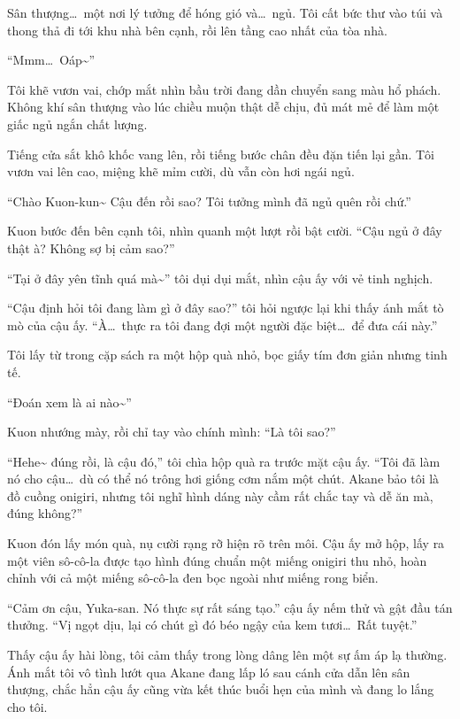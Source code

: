 \documentclass[../main.tex]{subfiles}
\begin{document}
Sân thượng\dots\ một nơi lý tưởng để hóng gió và\dots\ ngủ. Tôi cất bức thư vào túi và thong thả đi tới khu nhà bên cạnh, rồi lên tầng cao nhất của tòa nhà.

\ct


``Mmm\dots\ Oáp\~{}''

Tôi khẽ vươn vai, chớp mắt nhìn bầu trời đang dần chuyển sang màu hổ phách. Không khí sân thượng vào lúc chiều muộn thật dễ chịu, đủ mát mẻ để làm một giấc ngủ ngắn chất lượng.

Tiếng cửa sắt khô khốc vang lên, rồi tiếng bước chân đều đặn tiến lại gần. Tôi vươn vai lên cao, miệng khẽ mỉm cười, dù vẫn còn hơi ngái ngủ.

``Chào Kuon-kun\~{} Cậu đến rồi sao? Tôi tưởng mình đã ngủ quên rồi chứ.''

Kuon bước đến bên cạnh tôi, nhìn quanh một lượt rồi bật cười. ``Cậu ngủ ở đây thật à? Không sợ bị cảm sao?''

``Tại ở đây yên tĩnh quá mà\~{}'' tôi dụi dụi mắt, nhìn cậu ấy với vẻ tinh nghịch.

``Cậu định hỏi tôi đang làm gì ở đây sao?'' tôi hỏi ngược lại khi thấy ánh mắt tò mò của cậu ấy. ``À\dots\ thực ra tôi đang đợi một người đặc biệt\dots\ để đưa cái này.''

Tôi lấy từ trong cặp sách ra một hộp quà nhỏ, bọc giấy tím đơn giản nhưng tinh tế.

``Đoán xem là ai nào\~{}''

Kuon nhướng mày, rồi chỉ tay vào chính mình: ``Là tôi sao?''

``Hehe\~{} đúng rồi, là cậu đó,'' tôi chìa hộp quà ra trước mặt cậu ấy. ``Tôi đã làm nó cho cậu\dots\ dù có thể nó trông hơi giống cơm nắm một chút. Akane bảo tôi là đồ cuồng onigiri, nhưng tôi nghĩ hình dáng này cầm rất chắc tay và dễ ăn mà, đúng không?''

Kuon đón lấy món quà, nụ cười rạng rỡ hiện rõ trên môi. Cậu ấy mở hộp, lấy ra một viên sô-cô-la được tạo hình đúng chuẩn một miếng onigiri thu nhỏ, hoàn chỉnh với cả một miếng sô-cô-la đen bọc ngoài như miếng rong biển.

``Cảm ơn cậu, Yuka-san. Nó thực sự rất sáng tạo.'' cậu ấy nếm thử và gật đầu tán thưởng. ``Vị ngọt dịu, lại có chút gì đó béo ngậy của kem tươi\dots\ Rất tuyệt.''

Thấy cậu ấy hài lòng, tôi cảm thấy trong lòng dâng lên một sự ấm áp lạ thường. Ánh mắt tôi vô tình lướt qua Akane đang lấp ló sau cánh cửa dẫn lên sân thượng, chắc hẳn cậu ấy cũng vừa kết thúc buổi hẹn của mình và đang lo lắng cho tôi.
\end{document}
